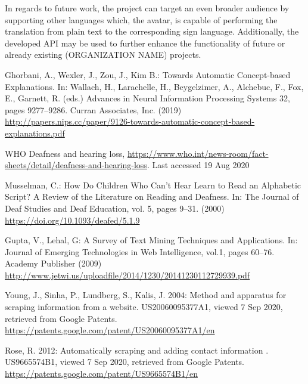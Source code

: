 \documentclass[runningheads]{llncs}
\begin{document}
In regards to future work, the project can target an even broader audience by supporting other languages which, the avatar, is capable of performing the translation from plain text to the corresponding sign language.
Additionally, the developed API may be used to further enhance the functionality of future or already existing (ORGANIZATION NAME) projects.


%
%
%
% 
% 
%
\begin{thebibliography}{8}
        Ghorbani, A., Wexler, J., Zou, J., Kim B.: Towards Automatic Concept-based Explanations.
        In: Wallach, H., Larachelle, H., Beygelzimer, A., Alchebuc, F., Fox, E., Garnett, R. (eds.)
        Advances in Neural Information Processing Systems 32, pages 9277--9286. Curran Associates, Inc. (2019)
        \url{http://papers.nips.cc/paper/9126-towards-automatic-concept-based-explanations.pdf}

        WHO Deafness and hearing loss, \url{https://www.who.int/news-room/fact-sheets/detail/deafness-and-hearing-loss}. Last accessed 19 Aug 2020

        Musselman, C.: How Do Children Who Can't Hear Learn to Read an Alphabetic Script? A Review of the Literature on Reading and Deafness.
        In: The Journal of Deaf Studies and Deaf Education, vol. 5, pages 9--31. (2000)
        \url{https://doi.org/10.1093/deafed/5.1.9}

        Gupta, V., Lehal, G: A Survey of Text Mining Techniques and Applications.
        In: Journal of Emerging Technologies in Web Intelligence, vol.1, pages 60--76. Academy Publisher (2009)
        \url{http://www.jetwi.us/uploadfile/2014/1230/20141230112729939.pdf}

        Young, J., Sinha, P., Lundberg, S., Kalis, J. 2004: Method and apparatus for scraping information from a website.
        US20060095377A1, viewed 7 Sep 2020, retrieved from Google Patents.
        \url{https://patents.google.com/patent/US20060095377A1/en}

        Rose, R. 2012: Automatically scraping and adding contact information .
        US9665574B1, viewed 7 Sep 2020, retrieved from Google Patents.
        \url{https://patents.google.com/patent/US9665574B1/en}


\end{thebibliography}
\end{document}
